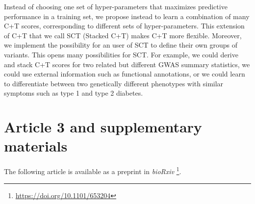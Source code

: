 Instead of choosing one set of hyper-parameters that maximizes predictive performance in a training set, we propose instead to learn a combination of many C+T scores, corresponding to different sets of hyper-parameters.
This extension of C+T that we call SCT (Stacked C+T) makes C+T more flexible.
Moreover, we implement the possibility for an user of SCT to define their own groups of variants. This opens many possibilities for SCT. For example, we could derive and stack C+T scores for two related but different GWAS summary statistics, we could use external information such as functional annotations, or we could learn to differentiate between two genetically different phenotypes with similar symptoms such as type 1 and type 2 diabetes.


\section{Article 3 and supplementary materials}

The following article is available as a preprint in \textit{bioRxiv}	\footnote{\url{https://doi.org/10.1101/653204}}.


